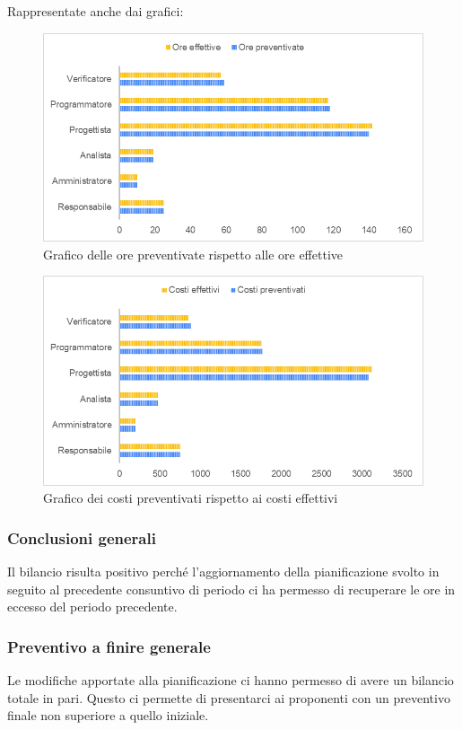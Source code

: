 Rappresentate anche dai grafici:
\begin{figure} [H]
	\includegraphics[width=\linewidth]{./img/Grafici/29.png}
	\caption{Grafico delle ore preventivate rispetto alle ore effettive}
\end{figure}

\begin{figure} [H]
	\includegraphics[width=\linewidth]{./img/Grafici/30.png}
	\caption{Grafico dei costi preventivati rispetto ai costi effettivi}
\end{figure}


\subsubsection{Conclusioni generali}
Il bilancio risulta positivo perché l'aggiornamento della pianificazione svolto in seguito al precedente consuntivo di periodo ci ha permesso di recuperare le ore in eccesso del periodo precedente.
\subsubsection{Preventivo a finire generale}
Le modifiche apportate alla pianificazione ci hanno permesso di avere un bilancio totale in pari. Questo ci permette di presentarci ai proponenti con un preventivo finale non superiore a quello iniziale.

